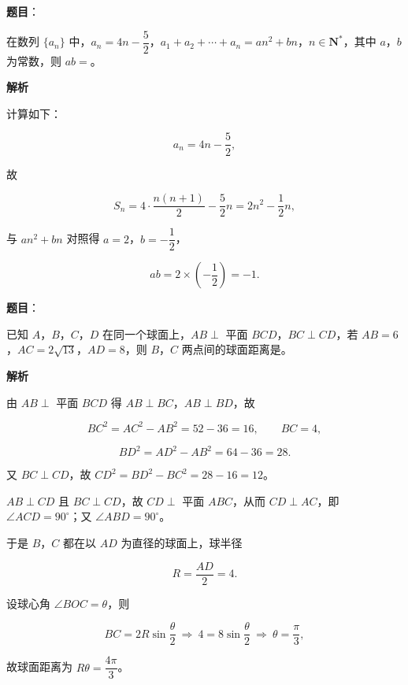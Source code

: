 \begin{answer}

\textbf{题目}：

在数列 $\{a_n\}$ 中，$a_n=4n-\dfrac52$，$a_1+a_2+\cdots+a_n=an^2+bn$，$n\in\mathbf N^*$，其中 $a$，$b$ 为常数，则 $ab=$\gkblank{}。

\textbf{解析}

计算如下：

\nopagebreak[4]
\[a_n=4n-\frac52,\]

故

\nopagebreak[4]
\[S_n=4\cdot\frac{n(n+1)}2-\frac52n=2n^2-\frac12n,\]

与 $an^2+bn$ 对照得 $a=2$，$b=-\dfrac12$，

\nopagebreak[4]
\[ab=2\times\left(-\frac12\right)=-1.\]


\end{answer}
\begin{answer}

\textbf{题目}：

已知 $A$，$B$，$C$，$D$ 在同一个球面上，$AB\perp$ 平面 $BCD$，$BC\perp CD$，若 $AB=6$，$AC=2\sqrt{13}$，$AD=8$，则 $B$，$C$ 两点间的球面距离是\gkblank{}。

\textbf{解析}

由 $AB\perp$ 平面 $BCD$ 得 $AB\perp BC$，$AB\perp BD$，故

\nopagebreak[4]
\[BC^2=AC^2-AB^2=52-36=16,\qquad BC=4,\]

\nopagebreak[4]
\[BD^2=AD^2-AB^2=64-36=28.\]

又 $BC\perp CD$，故 $CD^2=BD^2-BC^2=28-16=12$。

$AB\perp CD$ 且 $BC\perp CD$，故 $CD\perp$ 平面 $ABC$，从而 $CD\perp AC$，即 $\angle ACD=90^\circ$；又 $\angle ABD=90^\circ$。

于是 $B$，$C$ 都在以 $AD$ 为直径的球面上，球半径

\nopagebreak[4]
\[R=\frac{AD}2=4.\]

设球心角 $\angle BOC=\theta$，则

\nopagebreak[4]
\[BC=2R\sin\frac\theta2\ \Longrightarrow\ 4=8\sin\frac\theta2\ \Longrightarrow\ \theta=\frac{\pi}3,\]

故球面距离为 $R\theta=\dfrac{4\pi}3$。


\end{answer}

